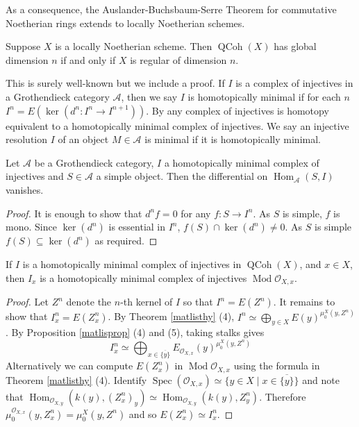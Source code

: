 \documentclass[12pt,oneside]{amsart}
\DeclareMathOperator{\Hom}{Hom}
\DeclareMathOperator{\Mod}{Mod}
\DeclareMathOperator{\QCoh}{QCoh}
\DeclareMathOperator{\Spec}{Spec}
\begin{document}
As a consequence, the Auslander-Buchsbaum-Serre Theorem for commutative Noetherian rings extends to locally Noetherian schemes. 

\begin{theorem} \label{ABSscheme}
Suppose $X$ is a locally Noetherian scheme. Then $\QCoh(X)$ has global dimension $n$ if and only if $X$ is regular of dimension $n$.
\end{theorem}


This is surely well-known but we include a proof. If $I$ is a complex of injectives in a Grothendieck category $\mathcal{A}$, then we say $I$ is homotopically minimal if for each $n$ $I^n = E(\ker(d^n: I^n \to I^{n+1}))$. By \cite[Proposition B.2]{kra05} any complex of injectives is homotopy equivalent to a homotopically minimal complex of injectives. We say an injective resolution $I$ of an object $M \in \mathcal{A}$ is minimal if it is homotopically minimal.

\begin{lemma} \label{minimallemma}
Let $\mathcal{A}$ be a Grothendieck category, $I$ a homotopically minimal complex of injectives and $S \in \mathcal{A}$ a simple object. Then the differential on $\Hom_{\mathcal{A}}(S,I)$ vanishes.
\end{lemma}

\begin{proof}
It is enough to show that $d^n f = 0$ for any $f: S \to I^n$. As $S$ is simple, $f$ is mono. Since $\ker(d^n)$ is essential in $I^n$, $f(S) \cap \ker(d^n) \neq 0$. As $S$ is simple $f(S) \subseteq \ker(d^n)$ as required.
\end{proof}


\begin{lemma} \label{localismininj}
If $I$ is a homotopically minimal complex of injectives in $\QCoh(X)$, and $x \in X$, then $I_x$ is a homotopically minimal complex of injectives $\Mod \mathcal{O}_{X,x}$.
\end{lemma}

\begin{proof}
Let $Z^n$ denote the $n$-th kernel of $I$ so that $I^n = E(Z^n)$. It remains to show that $I^n_x = E(Z^n_x)$. By Theorem \ref{matlisthy} (4), $I^n \simeq \bigoplus_{y \in X} E(y)^{\mu^X_0(y,Z^n)}$. By Proposition \ref{matlisprop} (4) and (5), taking stalks gives 
\[
I^n_x \simeq \bigoplus_{x \in \overline{\{y\}}}  E_{\mathcal{O}_{X,x}}(y)^{\mu_0^X(y,Z^n)}
\]
Alternatively we can compute $E(Z^n_x)$ in $\Mod \mathcal{O}_{X,x}$ using the formula in Theorem \ref{matlisthy} (4). Identify $\Spec(\mathcal{O}_{X,x}) \simeq \{y \in X \mid x \in \overline{\{y\}}\}$ and note that $\Hom_{\mathcal{O}_{X,y}}(k(y),(Z^n_x)_y) \simeq \Hom_{\mathcal{O}_{X,y}}(k(y),Z^n_y)$. Therefore $\mu_0^{\mathcal{O}_{X,x}}(y,Z^n_x) = \mu_0^{X}(y,Z^n)$ and so $E(Z_x^n) \simeq I_x^n$.  
\end{proof}
\end{document}
